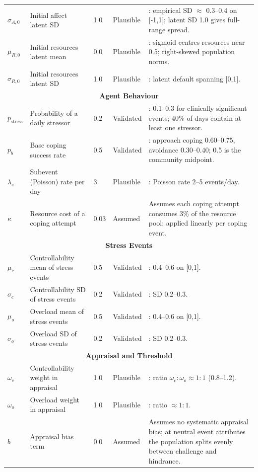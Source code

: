 \documentclass[
  letterpaper,
  DIV=11,
  numbers=noendperiod]{scrartcl}
\begin{document}
\begin{longtable}{lp{2.4cm}p{1.6cm}p{1.7cm}p{5.2cm}}
$\sigma_{A,0}$ & Initial affect latent SD & 1.0 & Plausible & \cite{watson1988}: empirical SD $\approx$ 0.3--0.4 on [-1,1]; latent SD 1.0 gives full-range spread. \\
$\mu_{R,0}$ & Initial resources latent mean & 0.0 & Plausible & \cite{Hobfoll2001}: sigmoid centres resources near 0.5; right-skewed population norms. \\
$\sigma_{R,0}$ & Initial resources latent SD & 1.0 & Plausible & \cite{Hobfoll2001}: latent default spanning [0,1]. \\
\midrule
\multicolumn{5}{c}{\textbf{Agent Behaviour}} \\
\midrule
$p_{\mathrm{stress}}$ & Probability of a daily stressor & 0.2 & Validated & \cite{almeida2002}: 0.1--0.3 for clinically significant events; 40\% of days contain at least one stressor. \\
$p_b$ & Base coping success rate & 0.5 & Validated & \cite{skinner2003}: approach coping 0.60--0.75, avoidance 0.30--0.40; 0.5 is the community midpoint. \\
$\lambda_s$ & Subevent (Poisson) rate per day & 3 & Plausible & \cite{almeida2002}: Poisson rate 2--5 events/day. \\
$\kappa$ & Resource cost of a coping attempt & 0.03 & Assumed & Assumes each coping attempt consumes 3\% of the resource pool; applied linearly per coping event. \\
\midrule
\multicolumn{5}{c}{\textbf{Stress Events}} \\
\midrule
$\mu_c$ & Controllability mean of stress events & 0.5 & Validated & \cite{bolger1991}: 0.4--0.6 on [0,1]. \\
$\sigma_c$ & Controllability SD of stress events & 0.2 & Validated & \cite{bolger1991}: SD 0.2--0.3. \\
$\mu_o$ & Overload mean of stress events & 0.5 & Validated & \cite{bolger1991}: 0.4--0.6 on [0,1]. \\
$\sigma_o$ & Overload SD of stress events & 0.2 & Validated & \cite{bolger1991}: SD 0.2--0.3. \\
\midrule
\multicolumn{5}{c}{\textbf{Appraisal and Threshold}} \\
\midrule
$\omega_c$ & Controllability weight in appraisal & 1.0 & Plausible & \cite{cavanaugh2000}: ratio $\omega_c:\omega_o \approx 1:1$ (0.8--1.2). \\
$\omega_o$ & Overload weight in appraisal & 1.0 & Plausible & \cite{cavanaugh2000}: ratio $\approx 1:1$. \\
$b$ & Appraisal bias term & 0.0 & Assumed & Assumes no systematic appraisal bias; at neutral event attributes the population splits evenly between challenge and hindrance. \\

\end{longtable}
\end{document}
